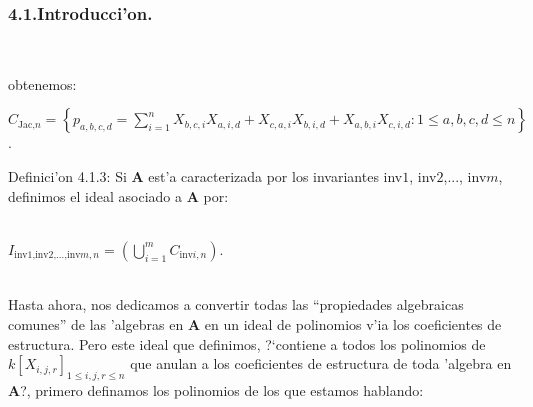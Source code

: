 \documentclass[10pt]{beamer}
\begin{document}
\begin{frame}
\frametitle{4.1.Introducci'on.}\\
\begin{block}{}
obtenemos:
\begin{center}
$C_{\text{Jac,}n}= \displaystyle \left \{ p_{a,b,c,d}= \sum_{i=1}^{n} X_{b,c,i} X_{a,i,d}+ X_{c,a,i} X_{b,i,d}+X_{a,b,i} X_{c,i,d} :1\leq a,b,c,d\leq n \right\}$.\\
\end{center}
\end{block}
\begin{block}{Definici'on 4.1.3:}
Si $\textbf{A}$ est'a caracterizada por los invariantes inv$1$, inv$2$,..., inv$m$, definimos el ideal asociado a $\textbf{A}$ por:\\
\\
\begin{center}
$\displaystyle I_{\text{inv1,inv2,...,inv}m,n}=\left(\bigcup\limits_{i=1}^{m} C_{\text{inv}i,n}\right)$.
\end{center}
\end{block}
\\

Hasta ahora, nos dedicamos a convertir todas las ``propiedades algebraicas comunes'' de las 'algebras en $\textbf{A}$ en un ideal de polinomios v'ia los coeficientes de estructura. Pero este ideal que definimos, ?`contiene a todos los polinomios de $k[X_{i,j,r}]_{1 \leq i,j,r \leq n}$ que anulan a los coeficientes de estructura de toda 'algebra en $\textbf{A}$?, primero definamos los polinomios de los que estamos hablando:\\
\end{frame}
\\
\end{document}
